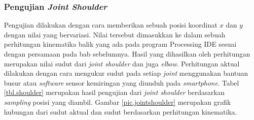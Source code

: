\subsubsection{Pengujian \textit{Joint Shoulder}}
Pengujian dilakukan dengan cara memberikan sebuah posisi koordinat $x$ dan $y$ dengan nilai yang bervariasi. Nilai tersebut dimasukkan ke dalam sebuah perhitungan kinematika balik yang ada pada program Processing IDE sesuai dengan persamaan pada bab sebelumnya. Hasil yang dihasilkan oleh perhitungan merupakan nilai sudut dari \textit{joint shoulder} dan juga \textit{elbow}. Perhitungan aktual dilakukan dengan cara mengukur sudut pada setiap \textit{joint} menggunakan bantuan busur atau \textit{software} sensor kemiringan yang diunduh pada \textit{smartphone}. Tabel \ref{tbl.shoulder} merupakan hasil pengujian dari \textit{joint shoulder} berdasarkan \textit{sampling} posisi yang diambil. Gambar \ref{pic.jointshoulder} merupakan grafik hubungan dari sudut aktual dan sudut berdasarkan perhitungan kinematika. 
